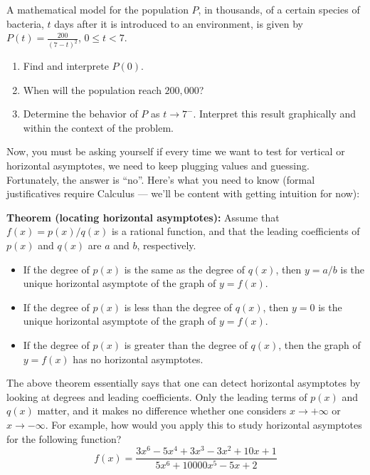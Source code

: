\documentclass{ximera}
\begin{document}
\begin{exploration}
  A mathematical model for the population $P$, in thousands, of a certain species of bacteria, $t$ days after it is introduced to an environment, is given by $P(t) = \frac{200}{(7-t)^2}$, $0 \leq t < 7$.
  \begin{enumerate}
  \item Find and interprete $P(0)$.
  \item When will the population reach $200,000$?
  \item Determine the behavior of $P$ as $t \to 7^-$. Interpret this result graphically and within the context of the problem.
  \end{enumerate}
\end{exploration}

Now, you must be asking yourself if every time we want to test for vertical or horizontal asymptotes, we need to keep plugging values and guessing. Fortunately, the answer is ``no''. Here's what you need to know (formal justificatives require Calculus --- we'll be content with getting intuition for now):

\begin{callout}
  {\bf Theorem (locating horizontal asymptotes):} Assume that $f(x) = p(x)/q(x)$ is a rational function, and that the leading coefficients of $p(x)$ and $q(x)$ are $a$ and $b$, respectively.
  \begin{itemize}
  \item If the degree of $p(x)$ is the same as the degree of $q(x)$, then $y=a/b$ is the unique horizontal asymptote of the graph of $y=f(x)$.
  \item If the degree of $p(x)$ is less than the degree of $q(x)$, then $y=0$ is the unique horizontal asymptote of the graph of $y=f(x)$.
  \item If the degree of $p(x)$ is greater than the degree of $q(x)$, then the graph of $y=f(x)$ has no horizontal asymptotes.
  \end{itemize}
\end{callout}


The above theorem essentially says that one can detect horizontal asymptotes by looking at degrees and leading coefficients. Only the leading terms of $p(x)$ and $q(x)$ matter, and it makes no difference whether one considers $x\to +\infty$ or $x\to -\infty$. For example, how would you apply this to study horizontal asymptotes for the following function? $$ f(x) =  \frac{3x^6-5x^4+3x^3-3x^2 + 10x + 1}{5x^6 + 10000x^5 - 5x+2}$$
\end{document}
